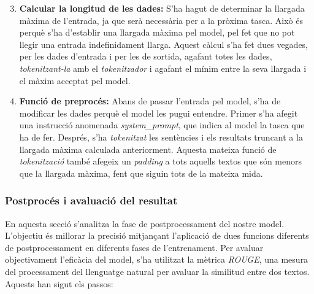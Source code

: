\begin{enumerate}
    \setcounter{enumi}{2}
    \item \textbf{Calcular la longitud de les dades:} S'ha hagut de determinar la llargada màxima de l'entrada, ja que serà necessària per a la pròxima tasca. Això és perquè s'ha d'establir una llargada màxima pel model, pel fet que no pot llegir una entrada indefinidament llarga. Aquest càlcul s'ha fet dues vegades, per les dades d'entrada i per les de sortida, agafant totes les dades, \textit{tokenitzant-la} amb el \textit{tokenitzador} i agafant el mínim entre la seva llargada i el màxim acceptat pel model.
    \item \textbf{Funció de preprocés:} Abans de passar l'entrada pel model, s'ha de modificar les dades perquè el model les pugui entendre. Primer s'ha afegit una instrucció anomenada \textit{system\_prompt}, que indica al model la tasca que ha de fer. Després, s'ha \textit{tokenitzat} les sentències i els resultats truncant a la llargada màxima calculada anteriorment. Aquesta mateixa funció de \textit{tokenització} també afegeix un \textit{padding} a tots aquells textos que són menors que la llargada màxima, fent que siguin tots de la mateixa mida.
\end{enumerate}


\subsubsection{Postprocés i avaluació del resultat}
En aquesta secció s'analitza la fase de postprocessament del nostre model. L'objectiu és millorar la precisió mitjançant l'aplicació de dues funcions diferents de postprocessament en diferents fases de l'entrenament. Per avaluar objectivament l'eficàcia del model, s'ha utilitzat la mètrica \textit{ROUGE}, una mesura del processament del llenguatge natural per avaluar la similitud entre dos textos. Aquests han sigut els passos:

